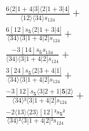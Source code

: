 \documentclass[varwidth, border=5pt]{standalone}
\begin{document}
\begin{my}
$\begin{gathered}
\scriptscriptstyle\frac{6⟨2|1+4|3]⟨2|1+3|4]}{⟨12⟩⟨34⟩s_{124}} +\\
\scriptscriptstyle\frac{6[12]s_{𝟓}⟨2|1+3|4]}{⟨34⟩⟨3|1+4|2]s_{124}} +\\
\scriptscriptstyle\frac{-3[14]s_{𝟓}s_{134}}{⟨34⟩⟨3|1+4|2]s_{124}} +\\
\scriptscriptstyle\frac{3[24]s_{𝟓}⟨2|3+4|1]}{⟨34⟩⟨3|1+4|2]s_{124}} +\\
\scriptscriptstyle\frac{-3[12]s_{𝟓}⟨3|2+1|𝟓|2⟩}{⟨34⟩²⟨3|1+4|2]s_{124}} +\\
\scriptscriptstyle\frac{-2⟨13⟩⟨23⟩[12]²s_{𝟓}²}{⟨34⟩²⟨3|1+4|2]²s_{124}} \phantom{+}
\end{gathered}$
\end{my}
\end{document}
